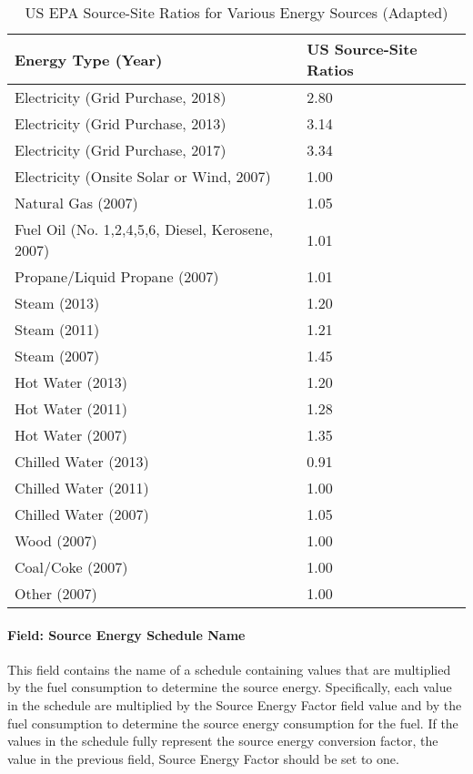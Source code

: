 {\scriptsize
\begin{longtable}[c]{p{4in}p{1.5in}}
\caption{US EPA Source-Site Ratios for Various Energy Sources (Adapted)\label{table:us_epa_source_site_ratios_for_various_energy_sources}} \tabularnewline
\toprule
Energy Type (Year) & US Source-Site Ratios \tabularnewline
\midrule
\endfirsthead

Electricity (Grid Purchase, 2018) & 2.80 \tabularnewline
Electricity (Grid Purchase, 2013) & 3.14 \tabularnewline
Electricity (Grid Purchase, 2017) & 3.34 \tabularnewline
Electricity (Onsite Solar or Wind, 2007) & 1.00 \tabularnewline
\midrule
Natural Gas (2007) & 1.05 \tabularnewline
Fuel Oil (No. 1,2,4,5,6, Diesel, Kerosene, 2007) & 1.01 \tabularnewline
Propane/Liquid Propane (2007) & 1.01 \tabularnewline
\midrule
Steam (2013) & 1.20 \tabularnewline
Steam (2011) & 1.21 \tabularnewline
Steam (2007) & 1.45 \tabularnewline
\midrule
Hot Water (2013) & 1.20 \tabularnewline
Hot Water (2011) & 1.28 \tabularnewline
Hot Water (2007) & 1.35 \tabularnewline
\midrule
Chilled Water (2013) & 0.91 \tabularnewline
Chilled Water (2011) & 1.00 \tabularnewline
Chilled Water (2007) & 1.05 \tabularnewline
\midrule
Wood (2007) & 1.00 \tabularnewline
Coal/Coke (2007) & 1.00 \tabularnewline
Other (2007) & 1.00 \tabularnewline

\bottomrule
\end{longtable}
}

\paragraph{Field: Source Energy Schedule Name}\label{field-source-energy-schedule-name}

This field contains the name of a schedule containing values that are multiplied by the fuel consumption to determine the source energy. Specifically, each value in the schedule are multiplied by the Source Energy Factor field value and by the fuel consumption to determine the source energy consumption for the fuel. If the values in the schedule fully represent the source energy conversion factor, the value in the previous field, Source Energy Factor should be set to one.

